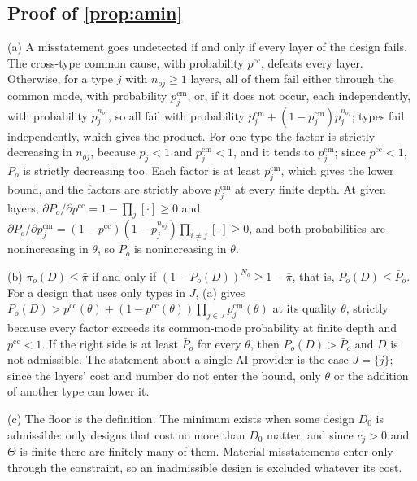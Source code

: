 \subsection*{Proof of \autoref{prop:amin}}

(a) A misstatement goes undetected if and only if every layer of the design fails. The cross-type common cause, with probability $p^{\mathrm{cc}}$, defeats every layer. Otherwise, for a type $j$ with $n_{oj}\ge1$ layers, all of them fail either through the common mode, with probability $p^{\mathrm{cm}}_j$, or, if it does not occur, each independently, with probability $p_j^{n_{oj}}$, so all fail with probability $p^{\mathrm{cm}}_j+(1-p^{\mathrm{cm}}_j)p_j^{n_{oj}}$; types fail independently, which gives the product. For one type the factor is strictly decreasing in $n_{oj}$, because $p_j<1$ and $p^{\mathrm{cm}}_j<1$, and it tends to $p^{\mathrm{cm}}_j$; since $p^{\mathrm{cc}}<1$, $P_o$ is strictly decreasing too. Each factor is at least $p^{\mathrm{cm}}_j$, which gives the lower bound, and the factors are strictly above $p^{\mathrm{cm}}_j$ at every finite depth. At given layers, $\partial P_o/\partial p^{\mathrm{cc}}=1-\prod_j[\cdot]\ge0$ and $\partial P_o/\partial p^{\mathrm{cm}}_j=(1-p^{\mathrm{cc}})(1-p_j^{n_{oj}})\prod_{i\ne j}[\cdot]\ge0$, and both probabilities are nonincreasing in $\theta$, so $P_o$ is nonincreasing in $\theta$.

(b) $\pi_o(D)\le\bar\pi$ if and only if $(1-P_o(D))^{N_o}\ge1-\bar\pi$, that is, $P_o(D)\le\bar P_o$. For a design that uses only types in $J$, (a) gives $P_o(D)>p^{\mathrm{cc}}(\theta)+(1-p^{\mathrm{cc}}(\theta))\prod_{j\in J}p^{\mathrm{cm}}_j(\theta)$ at its quality $\theta$, strictly because every factor exceeds its common-mode probability at finite depth and $p^{\mathrm{cc}}<1$. If the right side is at least $\bar P_o$ for every $\theta$, then $P_o(D)>\bar P_o$ and $D$ is not admissible. The statement about a single AI provider is the case $J=\{j\}$; since the layers' cost and number do not enter the bound, only $\theta$ or the addition of another type can lower it.

(c) The floor is the definition. The minimum exists when some design $D_0$ is admissible: only designs that cost no more than $D_0$ matter, and since $c_j>0$ and $\Theta$ is finite there are finitely many of them. Material misstatements enter only through the constraint, so an inadmissible design is excluded whatever its cost.

